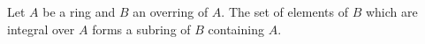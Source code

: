 Let $A$ be a ring and $B$ an overring of $A$. The set of elements of $B$ which are integral over $A$ forms a subring of $B$ containing $A$.
